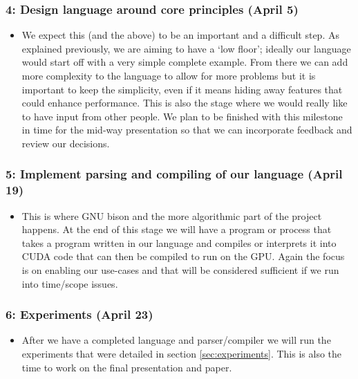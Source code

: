 \documentclass{article}
\begin{document}
\subsubsection*{4: Design language around core principles (April 5)}
\begin{itemize}
  \item We expect this (and the above) to be an important and a difficult step. As explained previously, we are aiming to have a `low floor'; ideally our language would start off with a very simple complete example. From there we can add more complexity to the language to allow for more problems but it is important to keep the simplicity, even if it means hiding away features that could enhance performance. This is also the stage where we would really like to have input from other people. We plan to be finished with this milestone in time for the mid-way presentation so that we can incorporate feedback and review our decisions.
\end{itemize}
 
\subsubsection*{5: Implement parsing and compiling of our language (April 19)}
\begin{itemize}  
  \item This is where GNU bison and the more algorithmic part of the project happens. At the end of this stage we will have a program or process that takes a program written in our language and compiles or interprets it into CUDA code that can then be compiled to run on the GPU. Again the focus is on enabling our use-cases and that will be considered sufficient if we run into time/scope issues.
\end{itemize}

\subsubsection*{6: Experiments (April 23)}
\begin{itemize}
  \item After we have a completed language and parser/compiler we will run the experiments that were detailed in section \ref{sec:experiments}. This is also the time to work on the final presentation and paper. 
\end{itemize}
\end{document}
